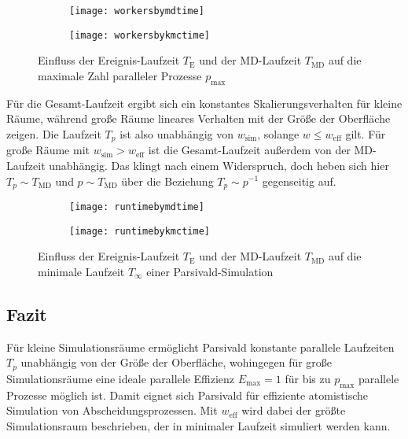 \begin{figure}[p]

  \captionsetup[subfigure]{singlelinecheck=false}
  \def\subfigwidth{7cm}
  \begin{subfigure}[t]{\subfigwidth}
    \texttt{[image: workersbymdtime]}
  \end{subfigure}
  \hfill
  \begin{subfigure}[t]{\subfigwidth}
    \texttt{[image: workersbykmctime]}
  \end{subfigure}

  \caption{Einfluss der Ereignis-Laufzeit $T_\text{E}$ und der MD-Laufzeit $T_\text{MD}$ auf die maximale Zahl paralleler Prozesse $p_\text{max}$}
  \label{fig:workersbytime}

\end{figure}

Für die Gesamt-Laufzeit ergibt sich ein konstantes Skalierungsverhalten für kleine Räume, während große Räume lineares Verhalten mit der Größe der Oberfläche zeigen.
Die Laufzeit $T_p$ ist also unabhängig von $w_\text{sim}$, solange $w \le w_\text{eff}$ gilt.
Für große Räume mit $w_\text{sim} > w_\text{eff}$ ist die Gesamt-Laufzeit außerdem von der MD-Laufzeit unabhängig.
Das klingt nach einem Widerspruch, doch heben sich hier $T_p \sim T_\text{MD}$ und $p \sim T_\text{MD}$ über die Beziehung $T_p \sim p^{-1}$ gegenseitig auf.

\begin{figure}[p]

  \captionsetup[subfigure]{singlelinecheck=false}
  \def\subfigwidth{7cm}
  \begin{subfigure}[t]{\subfigwidth}
    \texttt{[image: runtimebymdtime]}
  \end{subfigure}
  \hfill
  \begin{subfigure}[t]{\subfigwidth}
    \texttt{[image: runtimebykmctime]}
  \end{subfigure}

  \caption{Einfluss der Ereignis-Laufzeit $T_\text{E}$ und der MD-Laufzeit $T_\text{MD}$ auf die minimale Laufzeit $T_\infty$ einer Parsivald-Simulation}
  \label{fig:runtimebytime}

\end{figure}

\subsection{Fazit}

Für kleine Simulationsräume ermöglicht Parsivald konstante parallele Laufzeiten $T_p$ unabhängig von der Größe der Oberfläche, wohingegen für große Simulationsräume eine ideale parallele Effizienz $E_\text{max} = 1$ für bis zu $p_\text{max}$ parallele Prozesse möglich ist.
Damit eignet sich Parsivald für effiziente atomistische Simulation von Abscheidungsprozessen.
Mit $w_\text{eff}$ wird dabei der größte Simulationsraum beschrieben, der in minimaler Laufzeit simuliert werden kann.
